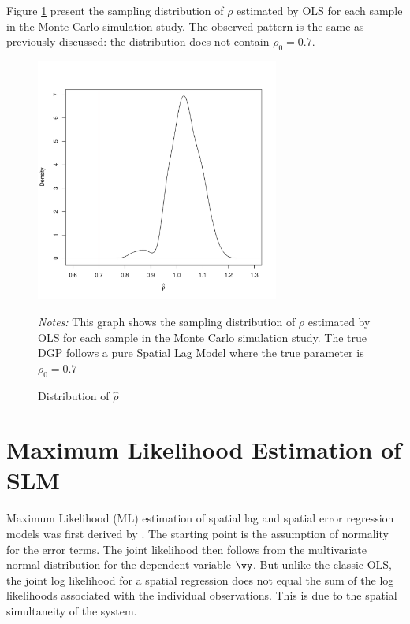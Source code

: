 \documentclass[english,12pt]{book}\usepackage[]{graphicx}\usepackage[]{xcolor}
\newenvironment{knitrout}{}{} %
\begin{document}
Figure \ref{fig:ols-rho-sim} present the sampling distribution of $\rho$ estimated by OLS for each sample in the Monte Carlo simulation study. The observed pattern is the same as previously discussed: the distribution does not contain $\rho_0 = 0.7$.

\begin{figure}[ht]
  \caption{Distribution of $\widehat{\rho}$}
    \label{fig:ols-rho-sim}
    \centering 
	\begin{minipage}{.9\linewidth}
\begin{knitrout}
\color{fgcolor}

{\centering \includegraphics[width=8cm,height=8cm]{figure/ols-rho-sim-1} 

}


\end{knitrout}
\footnotesize
		\emph{Notes:} This graph shows the sampling distribution of $\rho$ estimated by OLS for each sample in the Monte Carlo simulation study. The true DGP follows a pure Spatial Lag Model where the true parameter is $\rho_0 = 0.7$
	\end{minipage}	
\end{figure}

\section{Maximum Likelihood Estimation of SLM}

Maximum Likelihood (ML) estimation of spatial lag and spatial error regression models was first derived by \cite{ord1975estimation}. The starting point is the assumption of normality for the error terms. The joint likelihood then follows from the multivariate normal distribution for the dependent variable $\vy$. But unlike the classic OLS, the joint log likelihood for a spatial regression does not equal the sum of the log likelihoods associated with the individual observations. This is due to the spatial simultaneity of the system.
\end{document}
